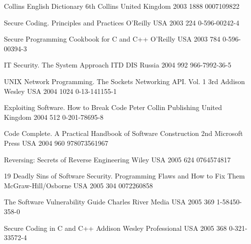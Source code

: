 \begin{thebibliography}{9}
		{}
		{Collins {E}nglish {D}ictionary}
		{6th}
		{Collins}
		{United Kingdom}
		{2003}
		{1888}
		{0007109822}
	
		{
			\BibAnd
			}
		{Secure Coding. Principles and Practices}
		{}
		{O'Reilly}
		{USA}
		{2003}
		{224}
		{0-596-00242-4}
	
		{
			\BibAnd
			}
		{Secure Programming Cookbook for {C} and {C++}}
		{}
		{O'Reilly}
		{USA}
		{2003}
		{784}
		{0-596-00394-3}
	
		{}
		{{IT} Security. The System Approach}
		{}
		{ITD DIS}
		{Russia}
		{2004}
		{992}
		{966-7992-36-5}
	
		{
			\BibAnd
			\BibAnd
			}
		{{UNIX} Network Programming. The Sockets Networking {API}. Vol. 1}
		{3rd}
		{Addison Wesley}
		{USA}
		{2004}
		{1024}
		{0-13-141155-1}
	
		{
			\BibAnd
			}
		{Exploiting Software. How to Break Code}
		{}
		{Peter Collin Publishing}
		{United Kingdom}
		{2004}
		{512}
		{0-201-78695-8}
	
		{}
		{Code Complete. A Practical Handbook of Software Construction}
		{2nd}
		{Microsoft Press}
		{USA}
		{2004}
		{960}
		{978073561967}
	
		{}
		{Reversing: Secrets of Reverse Engineering}
		{}
		{Wiley}
		{USA}
		{2005}
		{624}
		{0764574817}
	
		{
			\BibAnd
			\BibAnd
			}
		{19 Deadly Sins of Software Security. Programming Flaws and How to Fix Them}
		{}
		{McGraw-Hill/Osborne}
		{USA}
		{2005}
		{304}
		{0072260858}
	
		{
			\BibAnd
			}
		{The Software Vulnerability Guide}
		{}
		{Charles River Media}
		{USA}
		{2005}
		{369}
		{1-58450-358-0}
	
		{}
		{Secure Coding in {C} and {C++}}
		{}
		{Addison Wesley Professional}
		{USA}
		{2005}
		{368}
		{0-321-33572-4}
	

\end{thebibliography}
